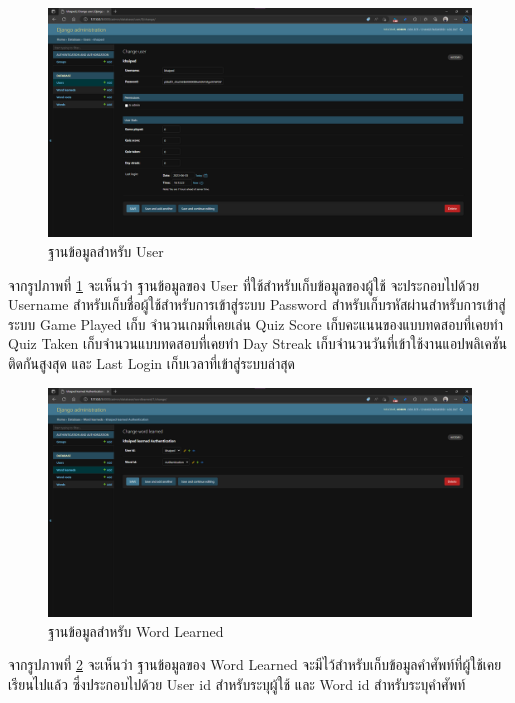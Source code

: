 \documentclass[12pt,oneside,openright,a4paper]{cpe-thai-project}
\begin{document}
\pagebreak
\begin{figure}[!h]\centering
	\includegraphics[width=\textwidth, keepaspectratio=true]{image/chap4/DB/user.png}
	\caption{{ฐานข้อมูลสำหรับ User}}\label{fig:chap4User}
\end{figure}
\hspace{1cm}
จากรูปภาพที่ \ref{fig:chap4User} จะเห็นว่า ฐานข้อมูลของ User ที่ใช้สำหรับเก็บข้อมูลของผู้ใช้
จะประกอบไปด้วย Username สำหรับเก็บชื่อผู้ใช้สำหรับการเข้าสู่ระบบ
Password สำหรับเก็บรหัสผ่านสำหรับการเข้าสู่ระบบ Game Played เก็บ จํานวนเกมที่เคยเล่น
Quiz Score เก็บคะแนนของแบบทดสอบที่เคยทํา Quiz Taken เก็บจํานวนแบบทดสอบที่เคยทํา
Day Streak เก็บจํานวนวันที่เข้าใช้งานแอปพลิเคชันติดกันสูงสุด และ Last Login เก็บเวลาที่เข้าสู่ระบบล่าสุด

\begin{figure}[!h]\centering
	\includegraphics[width=\textwidth, keepaspectratio=true]{image/chap4/DB/word learned.png}
	\caption{{ฐานข้อมูลสำหรับ Word Learned}}\label{fig:chap4WordLearned}
\end{figure}
\hspace{1cm}
จากรูปภาพที่ \ref{fig:chap4WordLearned} จะเห็นว่า ฐานข้อมูลของ Word Learned จะมีไว้สำหรับเก็บข้อมูลคำศัพท์ที่ผู้ใช้เคยเรียนไปแล้ว
ซึ่งประกอบไปด้วย User id สำหรับระบุผู้ใช้ และ Word id สำหรับระบุคำศัพท์
\end{document}

